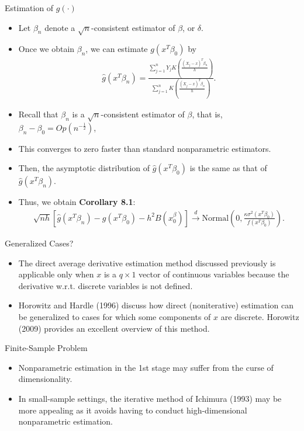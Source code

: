 \documentclass[xcolor=svgnames,dvipdfmx,cjk]{beamer}
\theoremstyle{example}
\def\darrow{\xrightarrow{d}}
\begin{document}
\begin{frame}{Estimation of $g(\cdot)$}
\begin{itemize}
  \item Let $\beta_n$ denote a $\sqrt{n}$-consistent estimator of $\beta$, or $\delta$.
  \item Once we obtain $\beta_n$, we can estimate $g(x^T\beta_0)$ by 
        \begin{align*}
          \hat{g}(x^T\beta_n) = 
          \frac
          {\sum_{j=1}^{n} Y_j K \left( \frac{(X_j - x)^T \beta_n}{h} \right)}
          {\sum_{j=1}^{n} K \left( \frac{(X_j - x)^T \beta_n}{h} \right)}.
        \end{align*}
  \item Recall that $\beta_n$ is a $\sqrt{n}$-consistent estimator of $\beta$, that is,
        $\beta_n - \beta_0 = Op(n^{-\frac{1}{2}})$, 
  \item This converges to zero faster than standard nonparametric estimators.
  \item Then, the asymptotic distribution of $\hat{g}(x^T\beta_0)$ is the same as that of $\hat{g}(x^T\beta_n)$.
  \item Thus, we obtain \textbf{Corollary 8.1}:
        \begin{align*}
          \sqrt{nh} [\hat{g}(x^T\beta_n) - g(x^T\beta_0) - h^2 B(x^\beta_0)] 
          \darrow 
          \text{Normal}\left( 0, \frac{\kappa \sigma^2(x^T\beta_0)}{f(x^T\beta_0)} \right).
        \end{align*}
\end{itemize}
\end{frame}


\begin{frame}{Generalized Cases?}
\begin{itemize}
  \item The direct average derivative estimation method discussed previously
        is applicable only when $x$ is a $q \times 1$ vector of continuous variables
        because the derivative w.r.t. discrete variables is not defined.
  \item Horowitz and Hardle (1996) discuss how direct (noniterative) estimation can be generalized to cases
        for which some components of $x$ are discrete.
        Horowitz (2009) provides an excellent overview of this method. 
\end{itemize}
\end{frame}

\begin{frame}{Finite-Sample Problem}
\begin{itemize}
  \item Nonparametric estimation in the 1st stage may suffer from the curse of dimensionality.
  \item In small-sample settings, the iterative method of Ichimura (1993) may be more appealing 
        as it avoids having to conduct high-dimensional nonparametric estimation.
\end{itemize}
\end{frame}
\end{document}
